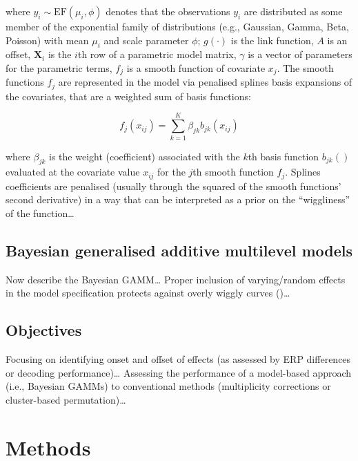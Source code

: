 \documentclass[
  doc,
  floatsintext,
  longtable,
  a4paper,
  nolmodern,
  notxfonts,
  notimes,
  colorlinks=true,linkcolor=blue,citecolor=blue,urlcolor=blue]{apa7}
\begin{document}
where \(y_{i} \sim \mathrm{EF}\left(\mu_{i}, \phi\right)\) denotes that
the observations \(y_{i}\) are distributed as some member of the
exponential family of distributions (e.g., Gaussian, Gamma, Beta,
Poisson) with mean \(\mu_{i}\) and scale parameter \(\phi\);
\(g(\cdot)\) is the link function, \(A\) is an offset,
\(\mathbf{X}_{i}\) is the \(i\)th row of a parametric model matrix,
\(\gamma\) is a vector of parameters for the parametric terms, \(f_{j}\)
is a smooth function of covariate \(x_{j}\). The smooth functions
\(f_{j}\) are represented in the model via penalised splines basis
expansions of the covariates, that are a weighted sum of basis
functions:

\[
f_{j}\left(x_{i j}\right) = \sum_{k=1}^K \beta_{jk} b_{jk}\left(x_{ij}\right)
\]

where \(\beta_{jk}\) is the weight (coefficient) associated with the
\(k\)th basis function \(b_{jk}()\) evaluated at the covariate value
\(x_{ij}\) for the \(j\)th smooth function \(f_{j}\). Splines
coefficients are penalised (usually through the squared of the smooth
functions' second derivative) in a way that can be interpreted as a
prior on the ``wiggliness'' of the function\ldots{}

\subsection{Bayesian generalised additive multilevel
models}\label{bayesian-generalised-additive-multilevel-models}

Now describe the Bayesian GAMM\ldots{} Proper inclusion of
varying/random effects in the model specification protects against
overly wiggly curves ()\ldots{}

\subsection{Objectives}\label{objectives}

Focusing on identifying onset and offset of effects (as assessed by ERP
differences or decoding performance)\ldots{} Assessing the performance
of a model-based approach (i.e., Bayesian GAMMs) to conventional methods
(multiplicity corrections or cluster-based permutation)\ldots{}

\section{Methods}\label{methods}
\end{document}

